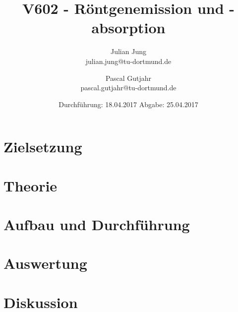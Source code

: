 

\title{V602 - Röntgenemission und -absorption}
\author{Julian Jung \\ julian.jung@tu-dortmund.de
  \and Pascal Gutjahr \\ pascal.gutjahr@tu-dortmund.de}
  \date{Durchführung: 18.04.2017
  \hspace{3em}
  Abgabe: 25.04.2017}
  
\maketitle
\newpage
\tableofcontents
\newpage
\section{Zielsetzung}
\section{Theorie}
\section{Aufbau und Durchführung}
\section{Auswertung}
\section{Diskussion}
% 
\printbibliography

